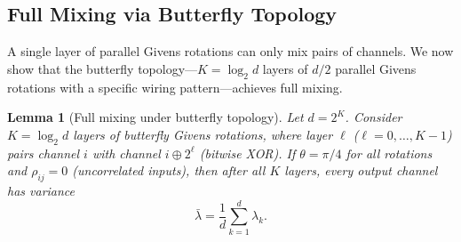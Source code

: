 \documentclass[11pt,a4paper]{article}
\newtheorem{lemma}[theorem]{Lemma}
\begin{document}
\subsection{Full Mixing via Butterfly Topology}

A single layer of parallel Givens rotations can only mix pairs of channels.
We now show that the butterfly topology---$K = \log_2 d$ layers of $d/2$ parallel Givens rotations with a specific wiring pattern---achieves full mixing.

\begin{lemma}[Full mixing under butterfly topology]
\label{lem:butterfly_mixing}
Let $d = 2^K$.
Consider $K = \log_2 d$ layers of butterfly Givens rotations, where layer $\ell$ ($\ell = 0, \ldots, K{-}1$) pairs channel $i$ with channel $i \oplus 2^\ell$ (bitwise XOR).
If $\theta = \pi/4$ for all rotations and $\rho_{ij} = 0$ (uncorrelated inputs), then after all $K$ layers, every output channel has variance
\begin{equation}
\bar{\lambda} = \frac{1}{d}\sum_{k=1}^{d} \lambda_k.
\end{equation}
\end{lemma}
\end{document}

